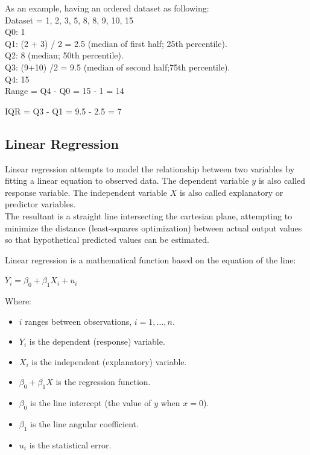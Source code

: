 \documentclass{article}
\begin{document}
As an example, having an ordered dataset as following:\\
Dataset = 1, 2, 3, 5, 8, 8, 9, 10, 15\\
Q0: 1\\
Q1: (2 + 3) / 2 = 2.5 (median of first half; 25th percentile).\\
Q2: 8 (median; 50th percentile).\\
Q3: (9+10)  /2 = 9.5 (median of second half;75th percentile).\\
Q4: 15\\

Range = Q4 - Q0 = 15 - 1 = 14

IQR = Q3 - Q1 = 9.5 - 2.5 = 7

\subsection{Linear Regression}
Linear regression attempts to model the relationship between two variables by fitting a linear equation to observed data. The dependent variable $y$ is also called response variable. The independent variable $X$ is also called explanatory or predictor variables. \\
The resultant is a straight line intersecting the cartesian plane, attempting to minimize the distance (least-squares optimization) between actual output values so that hypothetical predicted values can be estimated.

Linear regression is a mathematical function based on the equation of the line:

$\displaystyle {Y_{i}=\beta _{0}+\beta _{1}X_{i}+u_{i}}$

Where:\\
\begin{itemize}
    \item $\displaystyle i$ ranges between observations, $\displaystyle i=1,\ldots,n.$
    \item $\displaystyle Y_{i}$ is the dependent (response) variable.
    \item $\displaystyle X_i$ is the independent (explanatory) variable.
    \item $\displaystyle \beta _{0}+\beta _{1}X$ is the regression function.
    \item $\displaystyle \beta _{0}$ is the line intercept (the value of $y$ when $x = 0$).
    \item $\displaystyle \beta _{1}$ is the line angular coefficient.
    \item $\displaystyle u_{i}$ is the statistical error.
\end{itemize}
\end{document}
